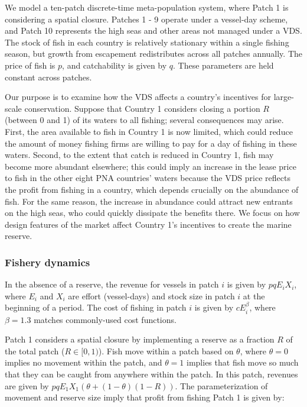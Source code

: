 \documentclass[12pt]{article}
\begin{document}
We model a ten-patch discrete-time meta-population system, where Patch 1 is considering a spatial closure. Patches 1 - 9 operate under a vessel-day scheme, and Patch 10 represents the high seas and other areas not managed under a VDS. The stock of fish in each country is relatively stationary within a single fishing season, but  growth from escapement redistributes across all patches annually. The price of fish is $p$, and catchability is given by $q$. These parameters are held constant across patches.

Our purpose is to examine how the VDS affects a country's incentives for large-scale conservation. Suppose that Country 1 considers closing a portion $R$ (between 0 and 1) of its waters to all fishing; several consequences may arise. First, the area available to fish in Country 1 is now limited, which could reduce the amount of money fishing firms are willing to pay for a day of fishing in these waters. Second, to the extent that catch is reduced in Country 1, fish may become more abundant elsewhere; this could imply an increase in the lease price to fish in the other eight PNA countries' waters because the VDS price reflects the profit from fishing in a country, which depends crucially on the abundance of fish. For the same reason, the increase in abundance could attract new entrants on the high seas, who could quickly dissipate the benefits there. We focus on how design features of the market affect Country 1's incentives to create the marine reserve.

\subsubsection{Fishery dynamics}

In the absence of a reserve, the revenue for vessels in patch $i$ is given by $pqE_iX_i$, where $E_i$ and $X_i$ are effort (vessel-days) and stock size in patch $i$ at the beginning of a period. The cost of fishing in patch $i$ is given by $cE_i^\beta$, where $\beta = 1.3$ matches commonly-used cost functions.

Patch 1 considers a spatial closure by implementing a reserve as a fraction $R$ of the total patch ($R \in[0,1)$). Fish move within a patch based on $\theta$, where $\theta = 0$ implies no movement within the patch, and $\theta = 1$ implies that fish move so much that they can be caught from anywhere within the patch. In this patch, revenues are given by $pqE_1X_1(\theta + (1 - \theta)(1 - R))$. The parameterization of movement and reserve size imply that profit from fishing Patch 1 is given by:
\end{document}
